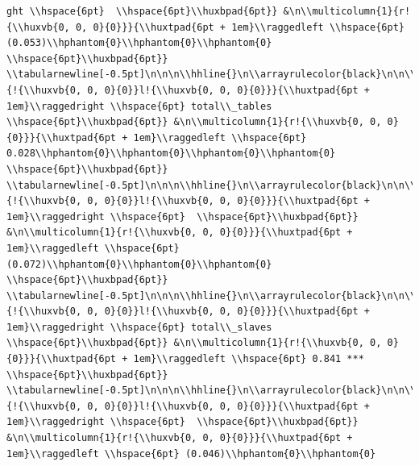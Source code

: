 \documentclass[11pt,preprint, authoryear]{elsarticle}
\numberwithin{equation}{section}
\numberwithin{figure}{section}
\numberwithin{table}{section}
\begin{document}
\begin{verbatim}
ght \\hspace{6pt}  \\hspace{6pt}\\huxbpad{6pt}} &\n\\multicolumn{1}{r!{\\huxvb{0, 0, 0}{0}}}{\\huxtpad{6pt + 1em}\\raggedleft \\hspace{6pt} (0.053)\\hphantom{0}\\hphantom{0}\\hphantom{0} \\hspace{6pt}\\huxbpad{6pt}} \\tabularnewline[-0.5pt]\n\n\n\\hhline{}\n\\arrayrulecolor{black}\n\n\\multicolumn{1}{!{\\huxvb{0, 0, 0}{0}}l!{\\huxvb{0, 0, 0}{0}}}{\\huxtpad{6pt + 1em}\\raggedright \\hspace{6pt} total\\_tables \\hspace{6pt}\\huxbpad{6pt}} &\n\\multicolumn{1}{r!{\\huxvb{0, 0, 0}{0}}}{\\huxtpad{6pt + 1em}\\raggedleft \\hspace{6pt} 0.028\\hphantom{0}\\hphantom{0}\\hphantom{0}\\hphantom{0} \\hspace{6pt}\\huxbpad{6pt}} \\tabularnewline[-0.5pt]\n\n\n\\hhline{}\n\\arrayrulecolor{black}\n\n\\multicolumn{1}{!{\\huxvb{0, 0, 0}{0}}l!{\\huxvb{0, 0, 0}{0}}}{\\huxtpad{6pt + 1em}\\raggedright \\hspace{6pt}  \\hspace{6pt}\\huxbpad{6pt}} &\n\\multicolumn{1}{r!{\\huxvb{0, 0, 0}{0}}}{\\huxtpad{6pt + 1em}\\raggedleft \\hspace{6pt} (0.072)\\hphantom{0}\\hphantom{0}\\hphantom{0} \\hspace{6pt}\\huxbpad{6pt}} \\tabularnewline[-0.5pt]\n\n\n\\hhline{}\n\\arrayrulecolor{black}\n\n\\multicolumn{1}{!{\\huxvb{0, 0, 0}{0}}l!{\\huxvb{0, 0, 0}{0}}}{\\huxtpad{6pt + 1em}\\raggedright \\hspace{6pt} total\\_slaves \\hspace{6pt}\\huxbpad{6pt}} &\n\\multicolumn{1}{r!{\\huxvb{0, 0, 0}{0}}}{\\huxtpad{6pt + 1em}\\raggedleft \\hspace{6pt} 0.841 *** \\hspace{6pt}\\huxbpad{6pt}} \\tabularnewline[-0.5pt]\n\n\n\\hhline{}\n\\arrayrulecolor{black}\n\n\\multicolumn{1}{!{\\huxvb{0, 0, 0}{0}}l!{\\huxvb{0, 0, 0}{0}}}{\\huxtpad{6pt + 1em}\\raggedright \\hspace{6pt}  \\hspace{6pt}\\huxbpad{6pt}} &\n\\multicolumn{1}{r!{\\huxvb{0, 0, 0}{0}}}{\\huxtpad{6pt + 1em}\\raggedleft \\hspace{6pt} (0.046)\\hphantom{0}\\hphantom{0}
\end{verbatim}
\end{document}
